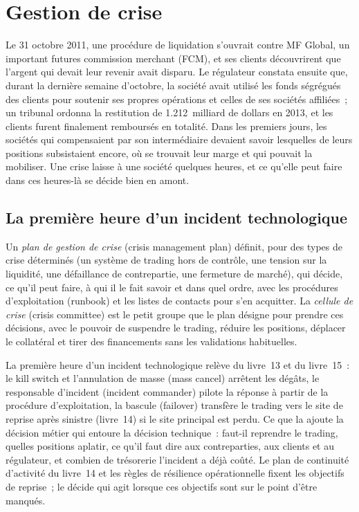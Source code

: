 \chapter{Gestion de crise}\label{ch:fm:crisis-management}

Le 31 octobre 2011, une procédure de liquidation s'ouvrait contre MF Global, un important futures commission merchant (FCM), et ses clients découvrirent que l'argent qui
devait leur revenir avait disparu. Le régulateur constata ensuite que, durant la dernière semaine d'octobre, la société avait utilisé les fonds ségrégués
des clients pour soutenir ses propres opérations et celles de ses sociétés affiliées~; un tribunal ordonna la restitution de 1.212~milliard de dollars en 2013, et les clients furent
finalement remboursés en totalité. Dans les premiers jours, les sociétés qui compensaient par son intermédiaire devaient savoir lesquelles de leurs positions subsistaient encore, où se trouvait leur
marge et qui pouvait la mobiliser. Une crise laisse à une société quelques heures, et ce qu'elle peut faire dans ces heures-là se décide bien en amont.

\section{La première heure d'un incident technologique}

\begin{definition}\label{def:fm:crisis-management:plan}
Un \emph{plan de gestion de crise} (crisis management plan) définit, pour des types de crise déterminés (un système de trading hors de contrôle, une tension
sur la liquidité, une défaillance de contrepartie, une fermeture de marché), qui décide, ce qu'il peut faire, à qui il le fait savoir et dans quel ordre, avec les procédures d'exploitation (runbook) et les listes de
contacts pour s'en acquitter. La \emph{cellule de crise} (crisis committee) est le petit groupe que le plan désigne pour prendre ces décisions, avec le pouvoir de
suspendre le trading, réduire les positions, déplacer le collatéral et tirer des financements sans les validations habituelles.
\end{definition}

La première heure d'un incident technologique relève du livre~13 et du livre~15~: le kill switch et l'annulation de masse (mass cancel) arrêtent les dégâts, le responsable d'incident (incident commander)
pilote la réponse à partir de la procédure d'exploitation, la bascule (failover) transfère le trading vers le site de reprise après sinistre (livre~14) si le site principal est perdu. Ce que la 
ajoute la décision métier qui entoure la décision technique~: faut-il reprendre le trading, quelles positions aplatir, ce qu'il faut dire aux contreparties, aux clients et au
régulateur, et combien de trésorerie l'incident a déjà coûté. Le plan de continuité d'activité du livre~14 et les règles de résilience opérationnelle fixent les
objectifs de reprise~; le  décide qui agit lorsque ces objectifs sont sur le point d'être manqués.


